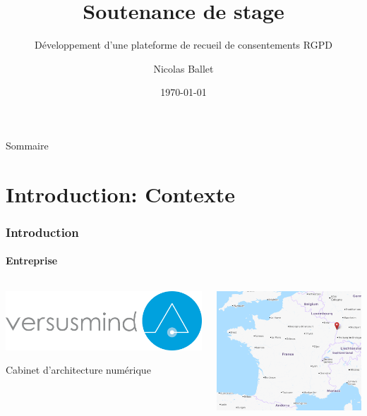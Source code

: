 \documentclass[aspectratio=169]{beamer}
\title[Développement d’une plateforme de recueil de consentements RGPD]{Soutenance de stage}
\subtitle{Développement d’une plateforme de recueil de consentements RGPD}
\author{Nicolas Ballet}
\institute[UTBM]{Université de Technologie de Belfort Montbéliard}
\date[\the\year-\twodigits\month-\twodigits\day]{\today}
\begin{document}
\begin{frame}
    \titlepage{}
\end{frame}
\begin{frame}{Sommaire}
    \tableofcontents
\end{frame}

\section{Introduction: Contexte}
\begin{frame}
    \frametitle{Introduction}
    \framesubtitle{Entreprise}
    \begin{columns}
        \hfill
        \begin{column}{0.45\textwidth}
            \begin{center}
                \hfill\includegraphics[width=1.0\textwidth]{versusmind.png}
            \end{center}
            \hfill \color{gray} Cabinet d'architecture numérique   
        \end{column}
        \begin{column}{0.5\textwidth}
            \begin{center}
                \includegraphics[width=1.0\textwidth]{strasbourg.png}
            \end{center}
        \end{column}
    \end{columns}
\end{frame}
\end{document}
